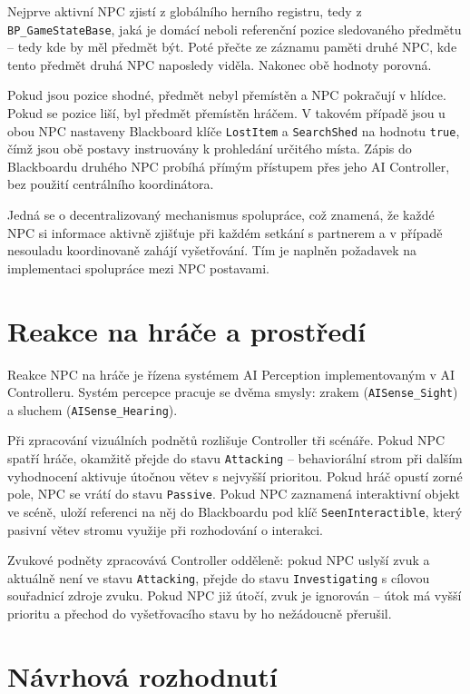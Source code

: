 Nejprve aktivní NPC zjistí z globálního herního registru, tedy z \texttt{BP\_GameStateBase}, jaká je domácí neboli referenční pozice 
sledovaného předmětu -- tedy kde by měl předmět být. 
Poté přečte ze záznamu paměti druhé NPC, kde tento předmět druhá NPC naposledy viděla. 
Nakonec obě hodnoty porovná.

Pokud jsou pozice shodné, předmět nebyl přemístěn a NPC pokračují v hlídce. 
Pokud se pozice liší, byl předmět přemístěn hráčem. 
V takovém případě jsou u obou NPC nastaveny Blackboard klíče \texttt{LostItem} a \texttt{SearchShed} na hodnotu \texttt{true}, čímž jsou 
obě postavy instruovány k prohledání určitého místa. 
Zápis do Blackboardu druhého NPC probíhá přímým přístupem přes jeho AI Controller, bez použití centrálního koordinátora.

Jedná se o decentralizovaný mechanismus spolupráce, což znamená, že každé NPC si informace aktivně zjišťuje 
při každém setkání s partnerem a v případě nesouladu koordinovaně zahájí vyšetřování. 
Tím je naplněn požadavek na implementaci spolupráce mezi NPC postavami.

\section{Reakce na hráče a prostředí}

Reakce NPC na hráče je řízena systémem AI Perception implementovaným v AI Controlleru. 
Systém percepce pracuje se dvěma smysly: zrakem (\texttt{AISense\_Sight}) a sluchem (\texttt{AISense\_Hearing}).

Při zpracování vizuálních podnětů rozlišuje Controller tři scénáře. 
Pokud NPC spatří hráče, okamžitě přejde do stavu \texttt{Attacking} -- behaviorální strom při dalším vyhodnocení aktivuje útočnou větev s nejvyšší prioritou. 
Pokud hráč opustí zorné pole, NPC se vrátí do stavu \texttt{Passive}. 
Pokud NPC zaznamená interaktivní objekt ve scéně, uloží referenci na něj do Blackboardu pod klíč \texttt{SeenInteractible}, který pasivní větev stromu využije 
při rozhodování o interakci.

Zvukové podněty zpracovává Controller odděleně: pokud NPC uslyší zvuk a aktuálně není ve stavu \texttt{Attacking}, přejde do stavu \texttt{Investigating} 
s cílovou souřadnicí zdroje zvuku. 
Pokud NPC již útočí, zvuk je ignorován -- útok má vyšší prioritu a přechod do vyšetřovacího stavu by ho nežádoucně přerušil.

\section{Návrhová rozhodnutí}


